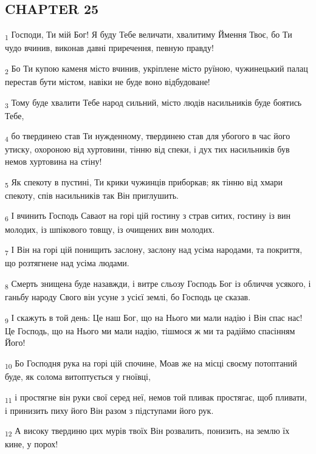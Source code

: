 \subsection{CHAPTER 25}
\begin{tcolorbox}
\textsubscript{1} Господи, Ти мій Бог! Я буду Тебе величати, хвалитиму Ймення Твоє, бо Ти чудо вчинив, виконав давні приречення, певную правду!
\end{tcolorbox}
\begin{tcolorbox}
\textsubscript{2} Бо Ти купою каменя місто вчинив, укріплене місто руїною, чужинецький палац перестав бути містом, навіки не буде воно відбудоване!
\end{tcolorbox}
\begin{tcolorbox}
\textsubscript{3} Тому буде хвалити Тебе народ сильний, місто людів насильників буде боятись Тебе,
\end{tcolorbox}
\begin{tcolorbox}
\textsubscript{4} бо твердинею став Ти нужденному, твердинею став для убогого в час його утиску, охороною від хуртовини, тінню від спеки, і дух тих насильників був немов хуртовина на стіну!
\end{tcolorbox}
\begin{tcolorbox}
\textsubscript{5} Як спекоту в пустині, Ти крики чужинців приборкав; як тінню від хмари спекоту, спів насильників так Він приглушить.
\end{tcolorbox}
\begin{tcolorbox}
\textsubscript{6} І вчинить Господь Саваот на горі цій гостину з страв ситих, гостину із вин молодих, із шпікового товщу, із очищених вин молодих.
\end{tcolorbox}
\begin{tcolorbox}
\textsubscript{7} І Він на горі цій понищить заслону, заслону над усіма народами, та покриття, що розтягнене над усіма людами.
\end{tcolorbox}
\begin{tcolorbox}
\textsubscript{8} Смерть знищена буде назавжди, і витре сльозу Господь Бог із обличчя усякого, і ганьбу народу Свого він усуне з усієї землі, бо Господь це сказав.
\end{tcolorbox}
\begin{tcolorbox}
\textsubscript{9} І скажуть в той день: Це наш Бог, що на Нього ми мали надію і Він спас нас! Це Господь, що на Нього ми мали надію, тішмося ж ми та радіймо спасінням Його!
\end{tcolorbox}
\begin{tcolorbox}
\textsubscript{10} Бо Господня рука на горі цій спочине, Моав же на місці своєму потоптаний буде, як солома витоптується у гноївці,
\end{tcolorbox}
\begin{tcolorbox}
\textsubscript{11} і простягне він руки свої серед неї, немов той пливак простягає, щоб пливати, і принизить пиху його Він разом з підступами його рук.
\end{tcolorbox}
\begin{tcolorbox}
\textsubscript{12} А високу твердиню цих мурів твоїх Він розвалить, понизить, на землю їх кине, у порох!
\end{tcolorbox}
